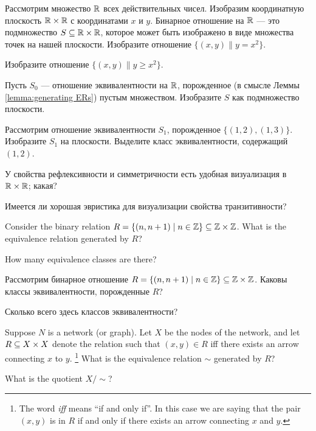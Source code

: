 \documentclass[CT4S-EN-RU]{subfiles}
\begin{document}
\begin{exerciseRUS}
Рассмотрим множество $\RR$ всех действительных чисел. Изобразим координатную плоскость $\RR\times\RR$ с координатами $x$ и $y$. Бинарное отношение на $\RR$ — это подмножество $S\ss\RR\times\RR$, которое может быть изображено в виде множества точек на нашей плоскости. 
\sexc Изобразите отношение $\{(x,y)\|y=x^2\}$. 
\item Изобразите отношение $\{(x,y)\|y\geq x^2\}.$
\item Пусть $S_0$ — отношение эквивалентности на $\RR$, порожденное (в смысле Леммы \ref{lemma:generating ERs}) пустым множеством. Изобразите $S$ как подмножество плоскости.
\item Рассмотрим отношение эквивалентности $S_1$, порожденное $\{(1,2),(1,3)\}$. Изобразите $S_1$ на плоскости. Выделите класс эквивалентности, содержащий $(1,2)$.
\item У свойства рефлексивности и симметричности есть удобная визуализация в $\RR\times\RR$; какая? 
\item Имеется ли хорошая эвристика для визуализации свойства транзитивности?
\endsexc
\end{exerciseRUS}

\begin{exerciseENG}
Consider the binary relation $R=\{(n,n+1)\|n\in\ZZ\}\ss\ZZ\times\ZZ$. 
\sexc What is the equivalence relation generated by $R$? 
\item How many equivalence classes are there?
\endsexc
\end{exerciseENG}

\begin{exerciseRUS}
Рассмотрим бинарное отношение $R=\{(n,n+1)\|n\in\ZZ\}\ss\ZZ\times\ZZ$. 
\sexc Каковы классы эквивалентности, порожденные $R$? 
\item Сколько всего здесь классов эквивалентности?
\endsexc
\end{exerciseRUS}

\begin{exerciseENG}
Suppose $N$ is a network (or graph). Let $X$ be the nodes of the network, and let $R\ss X\times X$ denote the relation such that $(x,y)\in R$ iff there exists an arrow connecting $x$ to $y$.%
\footnote{The word {\em iff} means “if and only if”. In this case we are saying that the pair $(x,y)$ is in $R$ if and only if there exists an arrow connecting $x$ and $y$.}
\sexc What is the equivalence relation $\sim$ generated by $R$? 
\item What is the quotient $X/\sim$?
\endsexc
\end{exerciseENG}
\end{document}

